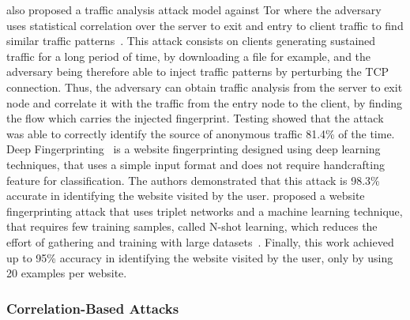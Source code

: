 \citeauthor{chakravarty2014trafficanalysis} also proposed a traffic analysis attack model against Tor where the adversary uses statistical correlation over the server to exit and entry to client traffic to find similar traffic patterns~\cite{chakravarty2014trafficanalysis}. This attack consists on clients generating sustained traffic for a long period of time, by downloading a file for example, and the adversary being therefore able to inject traffic patterns by perturbing the TCP connection. Thus, the adversary can obtain traffic analysis from the server to exit node and correlate it with the traffic from the entry node to the client, by finding the flow which carries the injected fingerprint.
Testing showed that the attack was able to correctly identify the source of anonymous traffic 81.4\% of the time.
Deep Fingerprinting~\cite{DeepFingerprinting} is a website fingerprinting designed using deep learning techniques, that uses a simple input format and does not require handcrafting feature for classification. The authors demonstrated that this attack is 98.3\% accurate in identifying the website visited by the user.
\citeauthor{TripletFingerprinting} proposed a website fingerprinting attack that uses triplet networks and a machine learning technique, that requires few training samples, called N-shot learning, which reduces the effort of gathering and training with large datasets~\cite{TripletFingerprinting}. Finally, this work achieved up to 95\% accuracy in identifying the website visited by the user, only by using 20 examples per website.

\subsubsection{Correlation-Based Attacks}\label{subsubsec:correlation_based_attacks}

